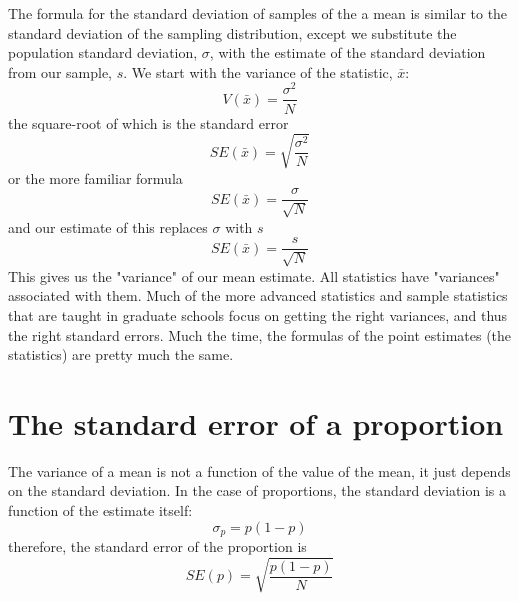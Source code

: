 The formula for the standard deviation of samples of the a mean is similar to the standard deviation of the sampling distribution, except we substitute the population standard deviation, $\sigma$, with the estimate of the standard deviation from our sample, $s$. We start with the variance of the statistic, $\bar{x}$:
\begin{equation}
V\left(\bar{x}\right) = \frac{\sigma^2}{N}
\end{equation}
the square-root of which is the standard error
\begin{equation}
SE\left(\bar{x}\right) = \sqrt{\frac{\sigma^2}{N}}
\end{equation}
or the more familiar formula
\begin{equation}\label{eq:meanvar}
SE\left(\bar{x}\right) = \frac{\sigma}{\sqrt{N}}
\end{equation}
and our estimate of this replaces $\sigma$ with $s$
\begin{equation}
SE\left(\bar{x}\right) = \frac{s}{\sqrt{N}}
\end{equation}
This gives us the "variance" of our mean estimate. All statistics have "variances" associated with them. Much of the more advanced statistics and sample statistics that are taught in graduate schools focus on getting the right variances, and thus the right standard errors. Much the time, the formulas of the point estimates (the statistics) are pretty much the same.

\section{The standard error of a proportion}
The variance of a mean is not a function of the value of the mean, it just depends on the standard deviation. In the case of proportions, the standard deviation is a function of the estimate itself:
\begin{equation}\label{eq:pvar}
\sigma_p=p\left(1-p\right)
\end{equation}
therefore, the standard error of the proportion is
\begin{equation}
SE\left(p\right) = \sqrt{\frac{p\left(1-p\right)}{N}}
\end{equation}
